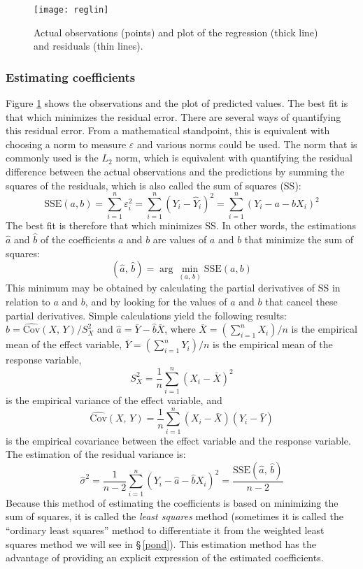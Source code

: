 \begin{figure}[htb]
\begin{center}
\texttt{[image: reglin]}
\end{center}
\caption[Actual observations (points) and plot of the regression (thick line) and residuals (thin lines)]{Actual observations (points) and plot of the regression (thick line) and residuals (thin lines).\label{reglin}}
\end{figure}

\subsubsection{Estimating coefficients}

 Figure \ref{reglin} shows the observations and the plot of predicted values. The best fit is that which minimizes the residual error. There are several ways of quantifying this residual error. From a mathematical standpoint, this is equivalent with choosing a norm to measure $\varepsilon$ and various norms could be used. The norm that is commonly used is the $L_2$ norm, which is equivalent with quantifying the residual difference between the actual observations and the predictions by summing the squares of the residuals, which is also called the sum of squares (SS):
\[
\mathrm{SSE}(a,b)=\sum_{i=1}^n\varepsilon_i^2=\sum_{i=1}^n(Y_i-\hat{Y}_i)^2
=\sum_{i=1}^n(Y_i-a-bX_i)^2
\]
The best fit is therefore that which minimizes SS. In other words, the estimations $\hat{a}$ and $\hat{b}$ of the coefficients $a$ and $b$ are values of $a$ and $b$ that minimize the sum of squares:
\[
(\hat{a},\,\hat{b})=\arg\min_{(a,\,b)}\mathrm{SSE}(a,b)
\]
This minimum may be obtained by calculating the partial derivatives of SS in relation to $a$ and $b$, and by looking for the values of $a$ and $b$ that cancel these partial derivatives. Simple calculations yield the following results:
$\hat{b}=\widehat{\mathrm{Cov}}(X,\,Y)/S_X^2$ and
$\hat{a}=\bar{Y}-\hat{b}\bar{X}$, where $\bar{X}=(\sum_{i=1}^nX_i)/n$
is the empirical mean of the effect variable, $\bar{Y}=(\sum_{i=1}^nY_i)/n$ is the empirical mean of the response variable,
\[
S_X^2=\frac{1}{n}\sum_{i=1}^n(X_i-\bar{X})^2
\]
is the empirical variance of the effect variable, and
\[
\widehat{\mathrm{Cov}}(X,\,Y)=\frac{1}{n}\sum_{i=1}^n(X_i-\bar{X})(Y_i-\bar{Y})
\]
is the empirical covariance between the effect variable and the response variable. The estimation of the residual variance is:
\[
\hat{\sigma}^2=\frac{1}{n-2}\sum_{i=1}^n(Y_i-\hat{a}-\hat{b}X_i)^2
=\frac{\mathrm{SSE}(\hat{a},\,\hat{b})}{n-2}
\]
Because this method of estimating the coefficients is based on minimizing the sum of squares, it is called the \emph{least squares} method (sometimes it is called the ``ordinary least squares'' method to differentiate it from the weighted least squares method we will see in \S\,\ref{pond}). This estimation method has the advantage of providing an explicit expression of the estimated coefficients.

